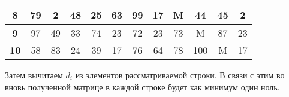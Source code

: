 \documentclass[17pt]{extarticle}
\begin{document}
\begin{table}[H]
\begin{tabular}{|c|c|c|c|c|c|c|c|c|c|c|c|}
        \textbf{8}   & 79          & 2           & 48          & 25          & 63          & 99          & 17          & M           & 44          & 45           & 2             \\ \hline
        \textbf{9}   & 97          & 49          & 33          & 74          & 23          & 72          & 23          & 73          & M           & 87           & 23            \\ \hline
        \textbf{10}  & 58          & 83          & 24          & 39          & 17          & 76          & 64          & 78          & 100         & M            & 17            \\ \hline
    \end{tabular}
\end{table}

Затем вычитаем \( d_i \) из элементов рассматриваемой строки. В связи с этим во вновь полученной матрице в каждой строке будет как минимум один ноль.
\end{document}

